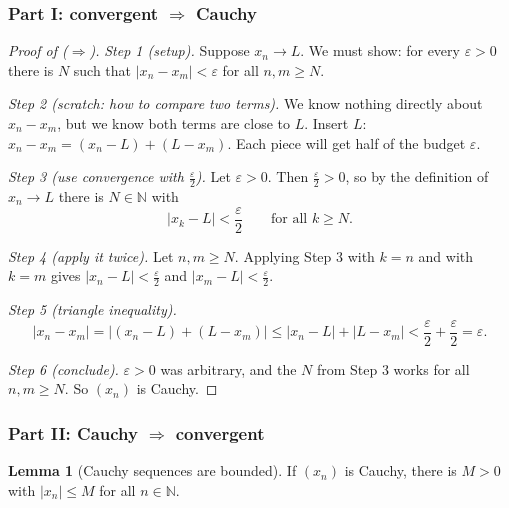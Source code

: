 \documentclass[11pt]{article}
\theoremstyle{definition}
\newtheorem{lem}[defn]{Lemma}
\newcommand{\N}{\mathbb{N}}
\newcommand{\eps}{\varepsilon}
\begin{document}
\subsubsection*{Part I: convergent $\Rightarrow$ Cauchy}

\begin{proof}[Proof of ($\Rightarrow$)]
\emph{Step 1 (setup).} Suppose $x_n\to L$. We must show: for every
$\eps>0$ there is $N$ such that $|x_n-x_m|<\eps$ for all $n,m\ge N$.

\emph{Step 2 (scratch: how to compare two terms).} We know nothing directly
about $x_n-x_m$, but we know both terms are close to $L$. Insert $L$:
$x_n-x_m=(x_n-L)+(L-x_m)$. Each piece will get half of the budget $\eps$.

\emph{Step 3 (use convergence with $\frac\eps2$).} Let $\eps>0$. Then
$\frac\eps2>0$, so by the definition of $x_n\to L$ there is $N\in\N$ with
\[
|x_k-L|<\frac\eps2\qquad\text{for all }k\ge N.
\]

\emph{Step 4 (apply it twice).} Let $n,m\ge N$. Applying Step 3 with $k=n$
and with $k=m$ gives $|x_n-L|<\frac\eps2$ and $|x_m-L|<\frac\eps2$.

\emph{Step 5 (triangle inequality).}
\[
|x_n-x_m|=|(x_n-L)+(L-x_m)|\le|x_n-L|+|L-x_m|<\frac\eps2+\frac\eps2=\eps.
\]

\emph{Step 6 (conclude).} $\eps>0$ was arbitrary, and the $N$ from Step 3
works for all $n,m\ge N$. So $(x_n)$ is Cauchy.
\end{proof}

\subsubsection*{Part II: Cauchy $\Rightarrow$ convergent}

\begin{lem}[Cauchy sequences are bounded]\label{lem:cbdd}
If $(x_n)$ is Cauchy, there is $M>0$ with $|x_n|\le M$ for all $n\in\N$.
\end{lem}
\end{document}
